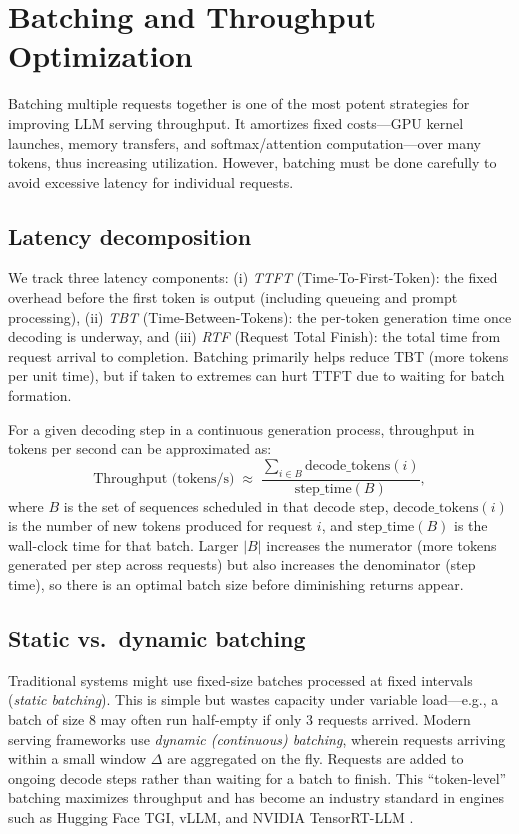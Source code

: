 
\section{Batching and Throughput Optimization}
\label{sec:batching-throughput}
Batching multiple requests together is one of the most potent strategies for improving LLM serving throughput. It amortizes fixed costs---GPU kernel launches, memory transfers, and softmax/attention computation---over many tokens, thus increasing utilization. However, batching must be done carefully to avoid excessive latency for individual requests.

\subsection{Latency decomposition}\label{sec:latency-decomposition}
We track three latency components: (i) \emph{TTFT} (Time-To-First-Token): the fixed overhead before the first token is output (including queueing and prompt processing), (ii) \emph{TBT} (Time-Between-Tokens): the per-token generation time once decoding is underway, and (iii) \emph{RTF} (Request Total Finish): the total time from request arrival to completion. Batching primarily helps reduce TBT (more tokens per unit time), but if taken to extremes can hurt TTFT due to waiting for batch formation.

For a given decoding step in a continuous generation process, throughput in tokens per second can be approximated as:
\[
\text{Throughput (tokens/s)} \;\approx\; \frac{\sum_{i\in B} \text{decode\_tokens}(i)}
{\text{step\_time}(B)},
\]
where $B$ is the set of sequences scheduled in that decode step, $\text{decode\_tokens}(i)$ is the number of new tokens produced for request $i$, and $\text{step\_time}(B)$ is the wall-clock time for that batch. Larger $|B|$ increases the numerator (more tokens generated per step across requests) but also increases the denominator (step time), so there is an optimal batch size before diminishing returns appear.

\subsection{Static vs.\ dynamic batching}\label{sec:static-dynamic-batching}
Traditional systems might use fixed-size batches processed at fixed intervals (\emph{static batching}). This is simple but wastes capacity under variable load---e.g., a batch of size 8 may often run half-empty if only 3 requests arrived. Modern serving frameworks use \emph{dynamic (continuous) batching}, wherein requests arriving within a small window $\Delta$ are aggregated on the fly. Requests are added to ongoing decode steps rather than waiting for a batch to finish. This ``token-level'' batching maximizes throughput and has become an industry standard in engines such as Hugging Face TGI, vLLM, and NVIDIA TensorRT-LLM \cite{pope2023exegpt}.

